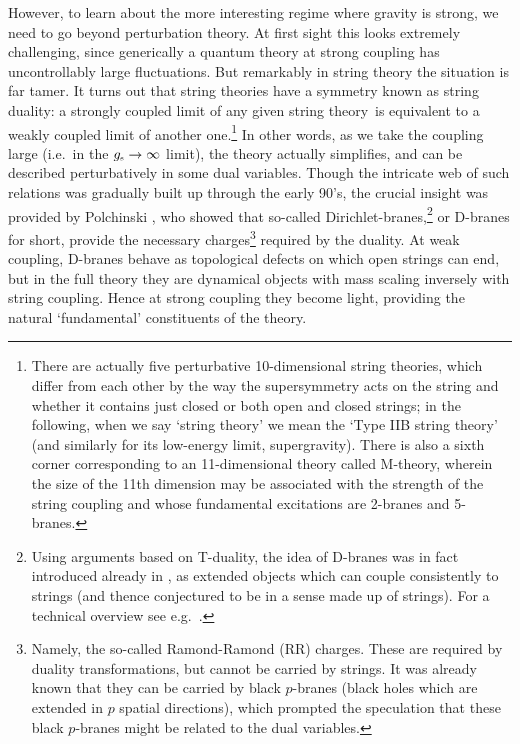 \documentclass[12pt,a4paper]{article}
\def\STY{string theory}
\def\gst{g_{\scriptscriptstyle {\rm s}}}
\begin{document}
However, to learn about the more interesting regime where gravity is strong, we need to go beyond perturbation theory.  At first sight this looks extremely challenging, since generically a quantum theory at strong coupling has uncontrollably large fluctuations.  But remarkably  in string theory the situation is far tamer.  It turns out that string theories have a symmetry known as string duality: a strongly coupled limit of any given \STY\ is equivalent to a weakly coupled limit of another one.\footnote{
There are actually five perturbative 10-dimensional string theories, which differ from each other by the way the supersymmetry acts on the string and whether it contains just closed or both open and closed strings; in the following, when we say `string theory' we mean the `Type IIB string theory' (and similarly for its low-energy limit, supergravity).  There is also a sixth corner corresponding to an 11-dimensional theory called M-theory, wherein the size of the 11th dimension may be associated with the strength of the string coupling and whose fundamental excitations are 2-branes and 5-branes.}  
In other words, as we take the coupling large (i.e.\ in the $\gst \to \infty$ limit), the theory actually simplifies, and can be described perturbatively in some dual variables.
Though the intricate web of such relations was gradually built up through the early 90's, the crucial insight was provided by Polchinski  \cite{Polchinski:1995mt}, who showed that so-called Dirichlet-branes,\footnote{
Using arguments based on T-duality, the idea of D-branes was in fact introduced already in \cite{Dai:1989ua}, 
as extended objects which can couple consistently to strings (and thence conjectured to be in a sense made up of strings).  For a technical overview see e.g.\ \cite{Polchinski:1996na}.
}  
or D-branes for short, provide the  necessary charges\footnote{
Namely, the so-called Ramond-Ramond (RR) charges.  These are required by duality transformations, but cannot be carried by strings.  It was already known that they can be carried by black $p$-branes \cite{Horowitz:1991cd} (black holes  which are extended in $p$ spatial directions), which prompted the speculation that these black $p$-branes might be related to the dual variables. 
}
 required by the duality.
At weak coupling, D-branes behave as topological defects on which open strings can end, but in the full theory they are dynamical objects with mass scaling inversely with string coupling.  Hence at strong coupling they become light, providing the natural `fundamental' constituents of the theory.
\end{document}
